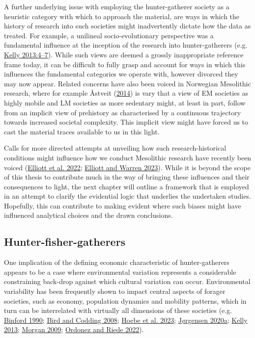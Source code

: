 \documentclass[
  12pt,
  a4paper,
  oneside]{book}
\begin{document}
A further underlying issue with employing the hunter-gatherer society as a heuristic category with which to approach the material, are ways in which the history of research into such societies might inadvertently dictate how the data as treated. For example, a unilineal socio-evolutionary perspective was a fundamental influence at the inception of the research into hunter-gatherers (e.g. \protect\hyperlink{ref-kelly2013}{Kelly 2013:4--7}). While such views are deemed a grossly inappropriate reference frame today, it can be difficult to fully grasp and account for ways in which this influences the fundamental categories we operate with, however divorced they may now appear. Related concerns have also been voiced in Norwegian Mesolithic research, where for example Åstveit (\protect\hyperlink{ref-uxe5stveit2014}{2014}) is vary that a view of EM societies as highly mobile and LM societies as more sedentary might, at least in part, follow from an implicit view of prehistory as characterised by a continuous trajectory towards increased societal complexity. This implicit view might have forced us to cast the material traces available to us in this light.

Calls for more directed attempts at unveiling how such research-historical conditions might influence how we conduct Mesolithic research have recently been voiced (\protect\hyperlink{ref-elliott2022}{Elliott et al. 2022}; \protect\hyperlink{ref-elliott2023}{Elliott and Warren 2023}). While it is beyond the scope of this thesis to contribute much in the way of bringing these influences and their consequences to light, the next chapter will outline a framework that is employed in an attempt to clarify the evidential logic that underlies the undertaken studies. Hopefully, this can contribute to making evident where such biases might have influenced analytical choices and the drawn conclusions.

\hypertarget{hunter-fisher-gatherers}{%
\subsection{Hunter-fisher-gatherers}\label{hunter-fisher-gatherers}}

One implication of the defining economic characteristic of hunter-gatherers appears to be a case where environmental variation represents a considerable constraining back-drop against which cultural variation can occur. Environmental variability has been frequently shown to impact central aspects of forager societies, such as economy, population dynamics and mobility patterns, which in turn can be interrelated with virtually all dimensions of these societies (e.g. \protect\hyperlink{ref-binford1990}{Binford 1990}; \protect\hyperlink{ref-bird2008}{Bird and Codding 2008}; \protect\hyperlink{ref-hoebe2023}{Hoebe et al. 2023}; \protect\hyperlink{ref-jorgensen2020a}{Jørgensen 2020a}; \protect\hyperlink{ref-kelly2013}{Kelly 2013}; \protect\hyperlink{ref-morgan2009}{Morgan 2009}; \protect\hyperlink{ref-ordonez2022}{Ordonez and Riede 2022}).
\end{document}
